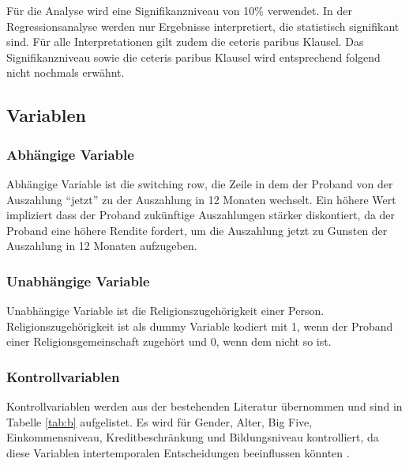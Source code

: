 \documentclass[11pt,a4paper]{article}
\begin{document}
Für die Analyse wird eine Signifikanzniveau von 10\% verwendet. In der Regressionsanalyse werden nur Ergebnisse interpretiert, die statistisch signifikant sind. Für alle Interpretationen gilt zudem die ceteris paribus Klausel. Das Signifikanzniveau sowie die ceteris paribus Klausel wird entsprechend folgend nicht nochmals erwähnt.

\subsection{Variablen}
\subsubsection{Abhängige Variable}
Abhängige Variable ist die switching row, die Zeile in dem der Proband von der Auszahlung “jetzt'' zu der Auszahlung in 12 Monaten wechselt. Ein höhere Wert impliziert dass der Proband zukünftige Auszahlungen stärker diskontiert, da der Proband eine höhere Rendite fordert, um die Auszahlung jetzt zu Gunsten der Auszahlung in 12 Monaten aufzugeben. 
 

\subsubsection{Unabhängige Variable}
Unabhängige Variable ist die Religionszugehörigkeit einer Person. Religionszugehörigkeit ist als dummy Variable kodiert mit 1, wenn der Proband einer Religionsgemeinschaft zugehört und 0, wenn dem nicht so ist.  


\subsubsection{Kontrollvariablen}
Kontrollvariablen werden aus der bestehenden Literatur übernommen und sind in Tabelle \ref{tab:b} aufgelistet. Es wird für Gender, Alter, Big Five, Einkommensniveau, Kreditbeschränkung und Bildungsniveau kontrolliert, da diese Variablen intertemporalen Entscheidungen beeinflussen könnten \parencite{dohmen2012interpreting,carter2012religious}.  \\
\end{document}
